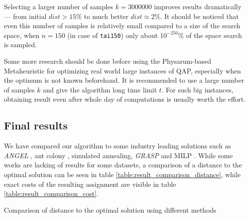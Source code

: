 Selecting a larger number of samples $k=3000000$ improves results dramatically --- from initial $dist>15\%$ to much better $dist{\approx}2\%$. It should be noticed that even this number of samples is relatively small compared to a size of the search space, when $n=150$ (in case of \texttt{tai150}) only about $10^{-250}\%$ of the space search is sampled.

Some more research should be done before using the Physarum-based Metaheuristic for optimizing real world large instances of QAP, especially when the optimum is not known beforehand. It is recommended to use a large number of samples $k$ and give the algorithm long time limit $t$. For such big instances, obtaining result even after whole day of computations is usually worth the effort.

\subsection{Final results}

We have compared our algorithm to some industry leading solutions such as \textit{ANGEL} \cite{tseng2006hybrid}, ant colony \cite{maniezzo1999ant}, simulated annealing, \textit{GRASP} and MILP \cite{karami2013analysis}. While some works are lacking of results for some datasets, a comparison of a distance to the optimal solution can be seen in table \ref{table:result_comparison_distance}, while exact costs of the resulting assignment are visible in table \ref{table:result_comparison_cost}.

\begin{table}
  \centering
  \caption{Comparison of distance to the optimal solution using different methods \cite{tseng2006hybrid, karami2013analysis, ramakrishnan1998tight, maniezzo1999ant}}
  \label{table:result_comparison_distance}

\end{table}

